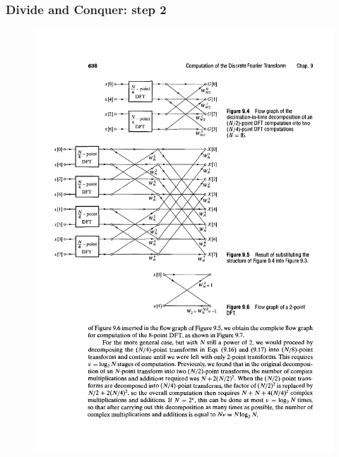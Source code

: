 \begin{frame}
\frametitle{Divide and Conquer: step 2}
\begin{figure}
  \centering
  \includegraphics[scale=1]{FFT4}\\
\end{figure}
\end{frame}


